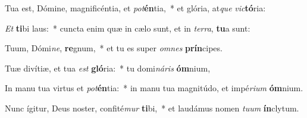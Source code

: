 \item Tua est, Dómine, magnificéntia, et \textit{pot}\textbf{én}tia,~* et glória, at\textit{que} \textit{vic}\textbf{tó}ria:
\item \textit{Et} \textbf{ti}bi laus:~* cuncta enim quæ in cælo sunt, et in \textit{ter}\textit{ra}, \textbf{tu}a sunt:
\item Tuum, Dómi\textit{ne}, \textbf{re}gnum,~* et tu es super \textit{om}\textit{nes} \textbf{prín}cipes.
\item Tuæ divítiæ, et tua \textit{est} \textbf{gló}ria:~* tu domi\textit{ná}\textit{ris} \textbf{óm}nium,
\item In manu tua virtus et \textit{pot}\textbf{én}tia:~* in manu tua magnitúdo, et impé\textit{ri}\textit{um} \textbf{óm}nium.
\item Nunc ígitur, Deus noster, confité\textit{mur} \textbf{ti}bi,~* et laudámus nomen \textit{tu}\textit{um} \textbf{ín}clytum.
